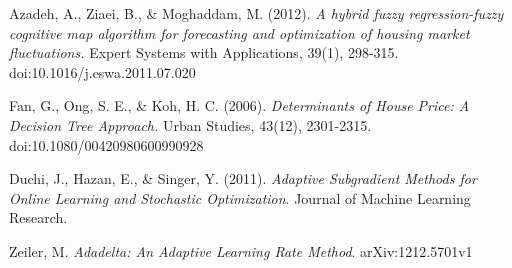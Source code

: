 \documentclass[10pt]{article}
\begin{document}
\begin{multicols}{2}
\begin{thebibliography}{13}
			Azadeh, A., Ziaei, B., \& Moghaddam, M. (2012).
			\textit{A hybrid fuzzy regression-fuzzy cognitive map algorithm for forecasting and optimization of housing market fluctuations.}
			Expert Systems with Applications, 39(1), 298-315. doi:10.1016/j.eswa.2011.07.020
			
			Fan, G., Ong, S. E., \& Koh, H. C. (2006).
			\textit{Determinants of House Price: A Decision Tree Approach.}
			Urban Studies, 43(12), 2301-2315. doi:10.1080/00420980600990928
			
			Duchi, J., Hazan, E., \& Singer, Y. (2011). \textit{Adaptive Subgradient Methods for Online Learning and Stochastic Optimization}. Journal of Machine Learning Research.
			
			Zeiler, M. \textit{Adadelta: An Adaptive Learning Rate Method}. arXiv:1212.5701v1
		\end{thebibliography}
	\end{multicols}
\end{document}
